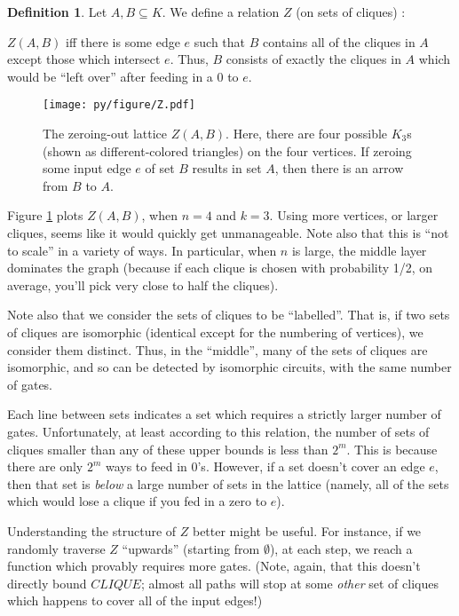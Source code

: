 \documentclass[12pt]{article}
\theoremstyle{definition}
\newtheorem{defn}{Definition}[section]
\begin{document}
\begin{defn}
\label{zRelation}
Let $A, B \subseteq K$. We define a relation $Z$ (on sets of cliques) :

$Z(A,B)$ iff there is some edge $e$ such that $B$ contains all of the
cliques in $A$ except those which intersect $e$. Thus, $B$ consists
of exactly the cliques in $A$ which would be ``left over'' after
feeding in a 0 to $e$.
\end{defn}

\begin{figure}
\centering
\texttt{[image: py/figure/Z.pdf]}
\caption{The zeroing-out lattice $Z(A,B).$
Here, there are four possible $K_3$s
(shown as different-colored triangles) on the four vertices.
If zeroing some input edge $e$ of set $B$ results in set $A$, then
there is an arrow from $B$ to $A$.
}

\label{fig:Z}
\end{figure}

Figure \ref{fig:Z} plots $Z(A,B)$, when $n=4$ and $k=3$.
Using more vertices, or
larger cliques, seems like it would quickly get unmanageable.
Note also that this is ``not to scale'' in a variety of ways. In
particular, when $n$ is large, the middle layer dominates the graph
(because if each clique is chosen with probability 1/2, on average,
you'll pick very close to half the cliques).

Note also that we consider the sets of cliques to be ``labelled''.
That is, if two sets of cliques are isomorphic (identical except for
the numbering of vertices), we consider them distinct.
Thus, in the ``middle'', many of the sets of cliques are isomorphic,
and so can be detected by isomorphic circuits, with the same 
number of gates.

Each line between sets indicates a set which requires a strictly larger
number of gates.  Unfortunately, at least according to this relation,
the number of sets of cliques smaller than
any of these upper bounds is less than $2^m$. This is because
there are only $2^m$ ways to feed in 0's.
However, if a set doesn't cover an edge $e$,
then that set is {\em below} a large number of sets in the lattice (namely,
all of the sets which would lose a clique if you fed in a zero to $e$).

Understanding the structure of $Z$ better might be useful.
For instance, if we randomly traverse $Z$ ``upwards'' (starting from $\emptyset$),
at each step, we reach a function which provably requires more gates. (Note,
again, that this doesn't directly bound $CLIQUE$; almost all paths will stop
at some {\em other} set of cliques which happens to cover all of the input edges!)
\end{document}
